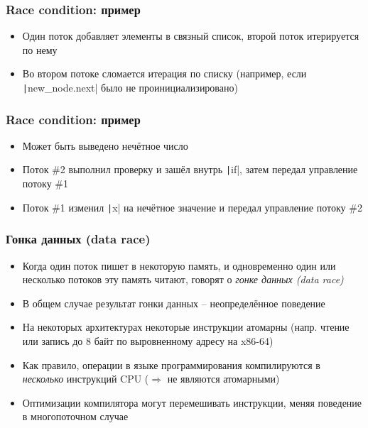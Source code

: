 \documentclass[10pt]{beamer}
\begin{document}
\begin{frame}[fragile]
\frametitle{Race condition: пример}
\begin{itemize}
\item Один поток добавляет элементы в связный список, второй поток итерируется по нему
\pause
{}
\pause
{}
\item Во втором потоке сломается итерация по списку (например, если \texttt|new_node.next| было не проинициализировано)
\end{itemize}
\end{frame}

\begin{frame}[fragile]
\frametitle{Race condition: пример}
\begin{itemize}
\pause
{}
\item Может быть выведено нечётное число
\pause
\item Поток \#2 выполнил проверку и зашёл внутрь \texttt|if|, затем передал управление потоку \#1
\pause
\item Поток \#1 изменил \texttt|x| на нечётное значение и передал управление потоку \#2
\end{itemize}
\end{frame}

\begin{frame}[fragile]
\frametitle{Гонка данных (data race)}
\begin{itemize}
\item Когда один поток пишет в некоторую память, и одновременно один или несколько потоков эту память читают, говорят о \textit{гонке данных (data race)}
\pause
\item В общем случае результат гонки данных -- неопределённое поведение
\pause
\item На некоторых архитектурах некоторые инструкции атомарны (напр. чтение или запись до 8 байт по выровненному адресу на x86-64)
\pause
\item Как правило, операции в языке программирования компилируются в \textit{несколько} инструкций CPU (\(\Longrightarrow\) не являются атомарными)
\pause
\item Оптимизации компилятора могут перемешивать инструкции, меняя поведение в многопоточном случае
\end{itemize}
\end{frame}
\end{document}

